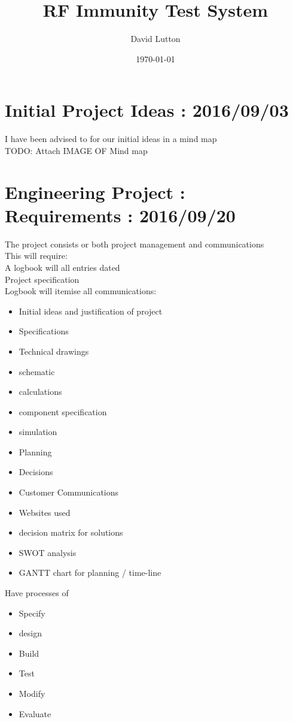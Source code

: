 \documentclass[a4paper]{article}
\title{RF Immunity Test System}
\author{David Lutton}
\date{\today}
\begin{document}
\maketitle\tableofcontents\listoftables
\newpage


\section{Initial Project Ideas : 2016/09/03}
I have been advised to for our initial ideas in a mind map\\
TODO: Attach IMAGE OF Mind map\\

\section{Engineering Project : Requirements : 2016/09/20}
The project consists or both project management and communications\\
This will require:\\
A logbook will all entries dated\\
Project specification\\
Logbook will itemise all communications:
\begin{itemize}
  \item Initial ideas and justification of project
  \item Specifications
  \item Technical drawings
  \item schematic
  \item calculations
  \item component specification
  \item simulation
  \item Planning
  \item Decisions
  \item Customer Communications
  \item Websites used
  \item decision matrix for solutions
  \item SWOT analysis
  \item GANTT chart for planning / time-line
\end{itemize}


Have processes of

\begin{itemize}
  \item Specify
  \item design
  \item Build
  \item Test
  \item Modify
  \item Evaluate
\end{itemize}
\end{document}
